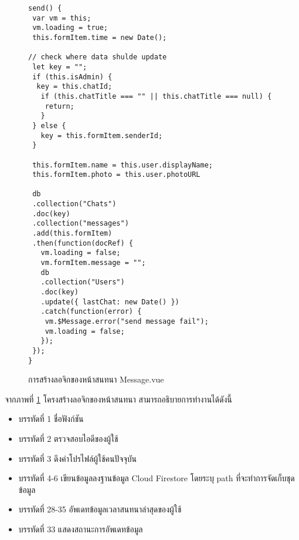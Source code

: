 	\begin{figure}[H]
		{\begin{lstlisting}
send() {
 var vm = this;
 vm.loading = true;
 this.formItem.time = new Date();

// check where data shulde update
 let key = "";
 if (this.isAdmin) {
  key = this.chatId;
   if (this.chatTitle === "" || this.chatTitle === null) {
    return;
   }
 } else {
   key = this.formItem.senderId;
 }

 this.formItem.name = this.user.displayName;
 this.formItem.photo = this.user.photoURL

 db
 .collection("Chats")
 .doc(key)
 .collection("messages")
 .add(this.formItem)
 .then(function(docRef) {
   vm.loading = false;
   vm.formItem.message = "";
   db
   .collection("Users")
   .doc(key)
   .update({ lastChat: new Date() })
   .catch(function(error) {
    vm.$Message.error("send message fail");
    vm.loading = false;
   });
 });
}
			\end{lstlisting}}
		\caption{การสร้างลอจิกของหน้าสนทนา Message.vue}
		\label{Fig:MessageJs}
	\end{figure}
	\newpage
	จากภาพที่ \ref{Fig:MessageJs} โครงสร้างลอจิกของหน้าสนทนา สามารถอธิบายการทำงานได้ดังนี้
	\begin{itemize}[label={--}]
		\item บรรทัดที่ 1  ชื่อฟังก์ชัน
		\item บรรทัดที่ 2 ตรวจสอบไอดีของผู้ใช้
		\item บรรทัดที่ 3 ดึงค่าโปรไฟล์ผู้ใช้คนปัจจุบัน
		\item บรรทัดที่ 4-6 เขียนข้อมูลลงฐานข้อมูล Cloud Firestore โดยระบุ path ที่จะทำการจัดเก็บชุดข้อมูล
		\item บรรทัดที่ 28-35 อัพเดทข้อมูลเวลาสนทนาล่าสุดของผู้ใช้
		\item บรรทัดที่ 33 แสดงสถานะการอัพเดทข้อมูล
	\end{itemize}

